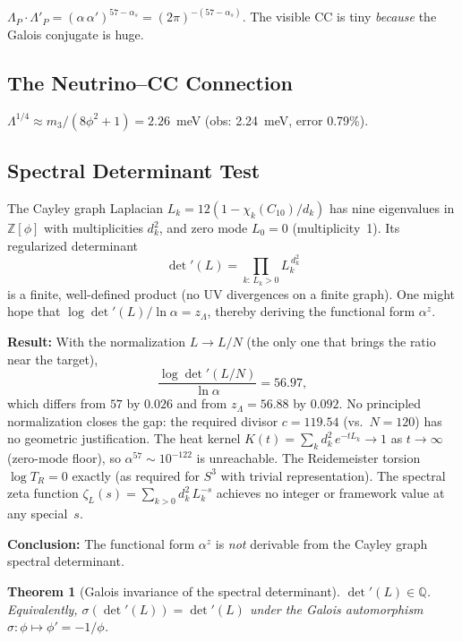 \documentclass[12pt,a4paper]{article}
\newtheorem{theorem}{Theorem}
\theoremstyle{definition}
\begin{document}
$\Lambda_P \cdot \Lambda'_P = (\alpha\,\alpha')^{57-\alpha_s} = (2\pi)^{-(57-\alpha_s)}$.
The visible CC is tiny \emph{because} the Galois conjugate is huge.

\subsection{The Neutrino--CC Connection}

$\Lambda^{1/4} \approx m_3 / (8\phi^2 + 1) = 2.26$~meV (obs: 2.24~meV, error 0.79\%).

\subsection{Spectral Determinant Test}
\label{sec:S-cc-det}

The Cayley graph Laplacian $L_k = 12(1 - \chi_k(C_{10})/d_k)$ has nine eigenvalues in $\mathbb{Z}[\phi]$ with multiplicities $d_k^2$, and zero mode $L_0 = 0$ (multiplicity~1).  Its regularized determinant
\begin{equation}
\det'(L) = \prod_{k:\, L_k > 0} L_k^{\,d_k^2}
\end{equation}
is a finite, well-defined product (no UV divergences on a finite graph).  One might hope that $\log\det'(L) / \ln\alpha = z_\Lambda$, thereby deriving the functional form $\alpha^z$.

\textbf{Result:} With the normalization $L \to L/N$ (the only one that brings the ratio near the target),
\begin{equation}
\frac{\log\det'(L/N)}{\ln\alpha} = 56.97,
\label{eq:cc-det-ratio}
\end{equation}
which differs from $57$ by $0.026$ and from $z_\Lambda = 56.88$ by $0.092$.  No principled normalization closes the gap: the required divisor $c = 119.54$ (vs.\ $N = 120$) has no geometric justification.  The heat kernel $K(t) = \sum_k d_k^2\,e^{-tL_k} \to 1$ as $t \to \infty$ (zero-mode floor), so $\alpha^{57} \sim 10^{-122}$ is unreachable.  The Reidemeister torsion $\log T_R = 0$ exactly (as required for $S^3$ with trivial representation).  The spectral zeta function $\zeta_L(s) = \sum_{k>0} d_k^2\,L_k^{-s}$ achieves no integer or framework value at any special~$s$.

\textbf{Conclusion:} The functional form $\alpha^z$ is \emph{not} derivable from the Cayley graph spectral determinant.

\begin{theorem}[Galois invariance of the spectral determinant]
\label{thm:S-det-galois}
$\det'(L) \in \mathbb{Q}$.  Equivalently, $\sigma(\det'(L)) = \det'(L)$ under the Galois automorphism $\sigma: \phi \mapsto \phi' = -1/\phi$.
\end{theorem}
\end{document}
